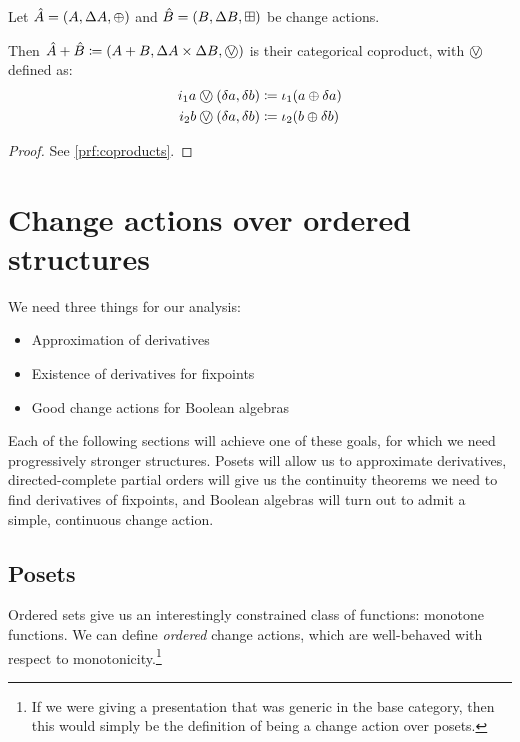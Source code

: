 \begin{prop}[name=Coproducts, restate=coproducts]
  \label{prop:coproducts}
  Let $\hat{A} = (A,\Delta A,\oplus)$ and $\hat{B} =
  (B,\Delta B,\boxplus)$ be change actions.

  Then $\cstr{A} + \cstr{B} \defeq \cstruct{A + B}{\changes{A} \times
  \changes{B}}{\cplusvee}$ is their categorical coproduct, with $\cplusvee$ defined as:
  \begin{align*}
    i_1 a \cplusvee (\change{a}, \change{b}) &\defeq \iota_1 (a \cplus \change{a})\\
    i_2 b \cplusvee (\change{a}, \change{b}) &\defeq \iota_2 (b \cplus \change{b})
  \end{align*}
\end{prop}
\ifproofs
\begin{proof}
  See \cref{prf:coproducts}.
\end{proof}
\fi

\section{Change actions over ordered structures}
\label{sec:moreStructures}

We need three things for our analysis:
\begin{itemize}
\item Approximation of derivatives
\item Existence of derivatives for fixpoints
\item Good change actions for Boolean algebras
\end{itemize}

Each of the following sections will achieve one of these goals, for which we
need progressively stronger structures. Posets will allow us to approximate
derivatives, directed-complete partial orders will give us the continuity
theorems we need to find derivatives of fixpoints, and Boolean algebras will
turn out to admit a simple, continuous change action.

\subsection{Posets}

Ordered sets give us an interestingly constrained class of functions: monotone
functions. We can define \emph{ordered} change actions, which are well-behaved
with respect to monotonicity.\footnote{If we were giving a presentation that was
generic in the base category, then this would simply be the definition of being
a change action over posets.}

